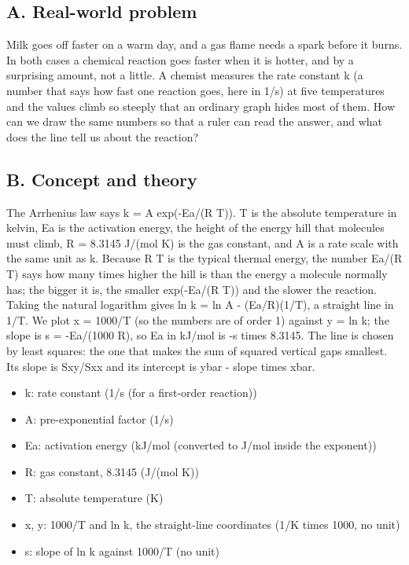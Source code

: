 \documentclass[11pt,a4paper]{article}
\begin{document}
\subsection*{A. Real-world problem}
Milk goes off faster on a warm day, and a gas flame needs a spark before it burns. In both cases a chemical reaction goes faster when it is hotter, and by a surprising amount, not a little. A chemist measures the rate constant k (a number that says how fast one reaction goes, here in 1/s) at five temperatures and the values climb so steeply that an ordinary graph hides most of them. How can we draw the same numbers so that a ruler can read the answer, and what does the line tell us about the reaction?

\subsection*{B. Concept and theory}
The Arrhenius law says k = A exp(-Ea/(R T)). T is the absolute temperature in kelvin, Ea is the activation energy, the height of the energy hill that molecules must climb, R = 8.3145 J/(mol K) is the gas constant, and A is a rate scale with the same unit as k. Because R T is the typical thermal energy, the number Ea/(R T) says how many times higher the hill is than the energy a molecule normally has; the bigger it is, the smaller exp(-Ea/(R T)) and the slower the reaction. Taking the natural logarithm gives ln k = ln A - (Ea/R)(1/T), a straight line in 1/T. We plot x = 1000/T (so the numbers are of order 1) against y = ln k; the slope is s = -Ea/(1000 R), so Ea in kJ/mol is -s times 8.3145. The line is chosen by least squares: the one that makes the sum of squared vertical gaps smallest. Its slope is Sxy/Sxx and its intercept is ybar - slope times xbar.

\begin{itemize}[nosep]
\item k: rate constant (1/s (for a first-order reaction))
\item A: pre-exponential factor (1/s)
\item Ea: activation energy (kJ/mol (converted to J/mol inside the exponent))
\item R: gas constant, 8.3145 (J/(mol K))
\item T: absolute temperature (K)
\item x, y: 1000/T and ln k, the straight-line coordinates (1/K times 1000, no unit)
\item s: slope of ln k against 1000/T (no unit)
\end{itemize}
\end{document}
